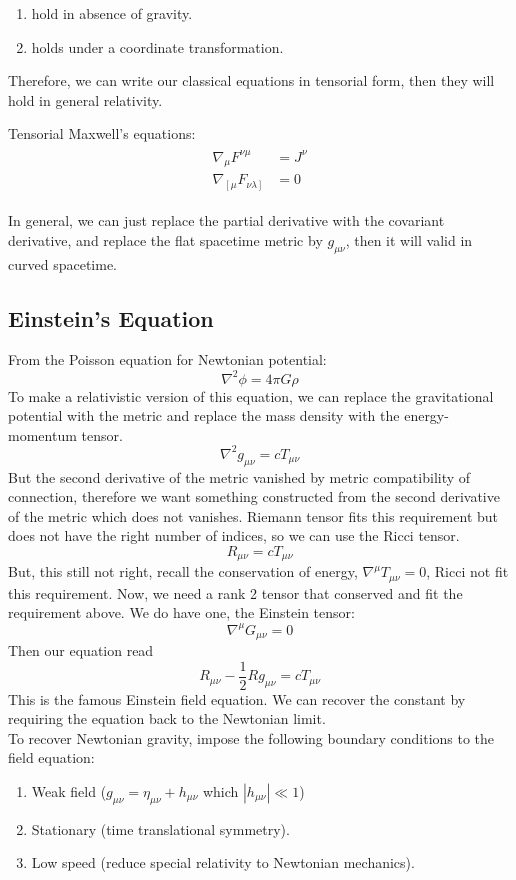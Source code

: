 \documentclass[12pt]{article}
\theoremstyle{mystyle}{\newtheorem{definition}{Definition}[section]}
\theoremstyle{mystyle}{\newtheorem{theorem}[definition]{Theorem}}
\theoremstyle{mystyle}{\newtheorem*{remark}{Remark}}
\theoremstyle{mystyle}{\newtheorem*{example}{Example}}
\theoremstyle{mystyle}{\newtheorem*{examples}{Examples}}
\theoremstyle{cstyle}{\newtheorem*{cthm}{}}
\begin{document}
\begin{enumerate}
  \item hold in absence of gravity.
  \item holds under a coordinate transformation.
\end{enumerate}
Therefore, we can write our classical equations in tensorial form, then they will hold in general relativity.

\begin{example}
  Tensorial Maxwell's equations:
  \begin{align*}
    \begin{split}
      \nabla_{\mu}F^{\nu\mu} &= J^{\nu}\\
      \nabla_{\left[ \mu\right.}F_{\left. \nu\lambda \right]} &= 0
    \end{split}
  \end{align*}
\end{example}

In general, we can just replace the partial derivative with the covariant derivative, and replace the flat spacetime metric by \(g_{\mu\nu}\),
then it will valid in curved spacetime.



\subsection{Einstein's Equation}
From the Poisson equation for Newtonian potential:
\[\nabla^2 \phi = 4 \pi G \rho\]
To make a relativistic version of this equation, we can replace the gravitational potential with the metric and replace the mass density with the energy-momentum tensor.
\[\nabla^2 g_{\mu\nu} = c T_{\mu\nu}\]
But the second derivative of the metric vanished by metric compatibility of connection, therefore we want something constructed from the second derivative of the metric which does not vanishes.
Riemann tensor fits this requirement but does not have the right number of indices, so we can use the Ricci tensor.
\[R_{\mu\nu} = c T_{\mu\nu}\]
But, this still not right, recall the conservation of energy, \(\nabla^{\mu}T_{\mu\nu} = 0\), Ricci not fit this requirement.
Now, we need a rank 2 tensor that conserved and fit the requirement above. We do have one, the Einstein tensor:
\[\nabla^{\mu}G_{\mu\nu} = 0\]
Then our equation read \[R_{\mu\nu} -\frac{1}{2}Rg_{\mu\nu} = cT_{\mu\nu}\]
This is the famous Einstein field equation. We can recover the constant by requiring the equation back to the Newtonian limit.\\
To recover Newtonian gravity, impose the following boundary conditions to the field equation:
\begin{enumerate}
  \item Weak field (\(g_{\mu\nu} = \eta_{\mu\nu} + h_{\mu\nu}\) which \(\left|h_{\mu\nu}\right| \ll 1\))
  \item Stationary (time translational symmetry).
  \item Low speed (reduce special relativity to Newtonian mechanics).
\end{enumerate}
\end{document}
